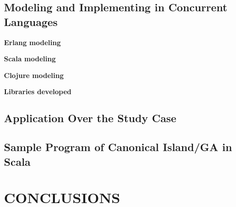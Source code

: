 \documentclass[a4paper,10pt,twoside, top=3.3cm,
bottom=4.2cm, left=2.6cm, right=2.6cm]{article}
\newcommand{\simpleEntry}[1]{
\vspace{.3cm}
\noindent \textbf{#1}
\vspace{.3cm}
}
\begin{document}
\subsection{Modeling and Implementing in Concurrent Languages}
\label{sec:impl}
    

\simpleEntry{Erlang modeling}
    

%    


\simpleEntry{Scala modeling}
    

%    

\simpleEntry{Clojure modeling}
    

%    
%

\simpleEntry{Libraries developed}
    


\subsection{Application Over the Study Case} \label{sec:results}%
    

\subsection{Sample Program of Canonical Island/GA in Scala}\label{sec:sample}


\section{\uppercase{Conclusions}}
\label{sec:conclusions}
    


%


%
%

\vfill

{\small
}
\end{document}

